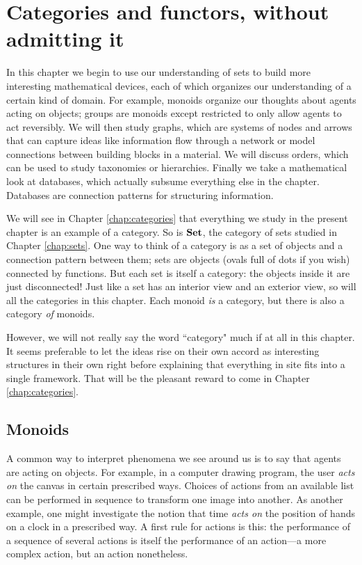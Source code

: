 \documentclass{book}
\def\Set{{\bf Set}}
\theoremstyle{remark}
\theoremstyle{definition}
\begin{document}

\chapter{Categories and functors, without admitting it}\label{chap:categories and functors without admitting it}

In this chapter we begin to use our understanding of sets to build more interesting mathematical devices, each of which organizes our understanding of a certain kind of domain. For example, monoids organize our thoughts about agents acting on objects; groups are monoids except restricted to only allow agents to act reversibly. We will then study graphs, which are systems of nodes and arrows that can capture ideas like information flow through a network or model connections between building blocks in a material. We will discuss orders, which can be used to study taxonomies or hierarchies. Finally we take a mathematical look at databases, which actually subsume everything else in the chapter. Databases are connection patterns for structuring information.

We will see in Chapter \ref{chap:categories} that everything we study in the present chapter is an example of a category. So is $\Set$, the category of sets studied in Chapter \ref{chap:sets}. One way to think of a category is as a set of objects and a connection pattern between them; sets are objects (ovals full of dots if you wish) connected by functions. But each set is itself a category: the objects inside it are just disconnected! Just like a set has an interior view and an exterior view, so will all the categories in this chapter. Each monoid {\em is} a category, but there is also a category {\em of} monoids. 

However, we will not really say the word ``category" much if at all in this chapter. It seems preferable to let the ideas rise on their own accord as interesting structures in their own right before explaining that everything in site fits into a single framework. That will be the pleasant reward to come in Chapter \ref{chap:categories}.


\section{Monoids}\label{sec:monoids}

A common way to interpret phenomena we see around us is to say that agents are acting on objects. For example, in a computer drawing program, the user {\em acts on} the canvas in certain prescribed ways. Choices of actions from an available list can be performed in sequence to transform one image into another. As another example, one might investigate the notion that time {\em acts on} the position of hands on a clock in a prescribed way. A first rule for actions is this: the performance of a sequence of several actions is itself the performance of an action---a more complex action, but an action nonetheless.
\end{document}
